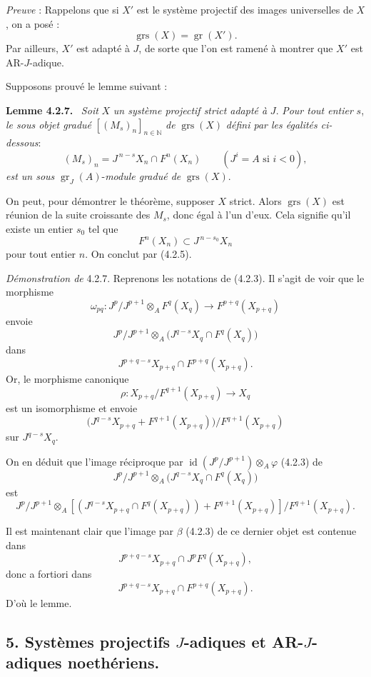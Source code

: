 \documentclass[11pt]{article}
\newenvironment{statement}[1]{\par\medskip\noindent\textbf{#1.}\ }{\par\medskip}
\providecommand{\gr}{\operatorname{gr}}
\providecommand{\id}{\operatorname{id}}
\providecommand{\id}{\operatorname{id}}
\providecommand{\gr}{\operatorname{gr}}
\providecommand{\gr}{\operatorname{gr}}
\providecommand{\grs}{\operatorname{grs}}
\providecommand{\id}{\operatorname{id}}
\providecommand{\id}{\operatorname{id}}
\providecommand{\id}{\operatorname{id}}
\providecommand{\id}{\operatorname{id}}
\begin{document}
\emph{Preuve} : Rappelons que si \(X'\) est le système projectif des images universelles de \(X\), on a posé :
\[
\grs(X)=\gr(X').
\]
Par ailleurs, \(X'\) est adapté à \(J\), de sorte que l'on est ramené à montrer que \(X'\) est AR-\(J\)-adique.

Supposons prouvé le lemme suivant :

\begin{statement}{Lemme 4.2.7}
\emph{Soit} \(X\) \emph{un système projectif strict adapté à} \(J\). \emph{Pour tout entier} \(s\), \emph{le sous objet gradué} \([(M_s)_n]_{n\in\mathbb N}\) \emph{de} \(\grs(X)\) \emph{défini par les égalités ci-dessous}:
\[
(M_s)_n=J^{\,n-s}X_n\cap F^n(X_n)\qquad(J^i=A\text{ si }i<0),
\]
\emph{est un
sous} \(\gr_J(A)\)-\emph{module gradué de} \(\grs(X)\).
\end{statement}

On peut, pour démontrer le théorème, supposer \(X\) strict. Alors \(\grs(X)\) est réunion de la suite croissante des \(M_s\), donc égal à l'un d'eux. Cela signifie qu'il existe un entier \(s_0\) tel que
\[
F^n(X_n)\subset J^{\,n-s_0}X_n
\]
pour tout entier \(n\). On conclut par (4.2.5).

\emph{Démonstration de} 4.2.7. Reprenons les notations de (4.2.3). Il s'agit de voir que le morphisme
\[
\omega_{pq}:J^p/J^{p+1}\otimes_A F^q(X_q)\longrightarrow F^{p+q}(X_{p+q})
\]
envoie
\[
J^p/J^{p+1}\otimes_A
\bigl(J^{q-s}X_q\cap F^q(X_q)\bigr)
\]
dans
\[
J^{p+q-s}X_{p+q}\cap F^{p+q}(X_{p+q}).
\]
Or, le morphisme canonique
\[
\rho:X_{p+q}/F^{q+1}(X_{p+q})\longrightarrow X_q
\]
est un isomorphisme et envoie
\[
\bigl(J^{q-s}X_{p+q}+F^{q+1}(X_{p+q})\bigr)/F^{q+1}(X_{p+q})
\]
sur \(J^{q-s}X_q\).

On en déduit que l'image réciproque par
\(\id(J^p/J^{p+1})\otimes_A\varphi\) (4.2.3) de
\[
J^p/J^{p+1}\otimes_A
\bigl(J^{q-s}X_q\cap F^q(X_q)\bigr)
\]
est
\[
J^p/J^{p+1}\otimes_A
[(J^{q-s}X_{p+q}\cap F^q(X_{p+q}))+F^{q+1}(X_{p+q})]/F^{q+1}(X_{p+q}).
\]

Il est maintenant clair que l'image par \(\beta\) (4.2.3) de ce dernier objet est contenue dans
\[
J^{p+q-s}X_{p+q}\cap J^pF^q(X_{p+q}),
\]
donc a fortiori dans
\[
J^{p+q-s}X_{p+q}\cap F^{p+q}(X_{p+q}).
\]
D'où le lemme.

\subsection*{5. Systèmes projectifs \(J\)-adiques et AR-\(J\)-adiques noethériens.}
\end{document}
